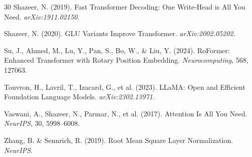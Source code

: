 \documentclass[12pt,a4paper]{article}
\begin{document}
\begin{thebibliography}{30}
Shazeer, N. (2019). Fast Transformer Decoding: One Write-Head is All You Need. \emph{arXiv:1911.02150}.

Shazeer, N. (2020). GLU Variants Improve Transformer. \emph{arXiv:2002.05202}.

Su, J., Ahmed, M., Lu, Y., Pan, S., Bo, W., \& Liu, Y. (2024). RoFormer: Enhanced Transformer with Rotary Position Embedding. \emph{Neurocomputing}, 568, 127063.

Touvron, H., Lavril, T., Izacard, G., et al. (2023). LLaMA: Open and Efficient Foundation Language Models. \emph{arXiv:2302.13971}.

Vaswani, A., Shazeer, N., Parmar, N., et al. (2017). Attention Is All You Need. \emph{NeurIPS}, 30, 5998--6008.

Zhang, B. \& Sennrich, R. (2019). Root Mean Square Layer Normalization. \emph{NeurIPS}.

\end{thebibliography}
\end{document}
